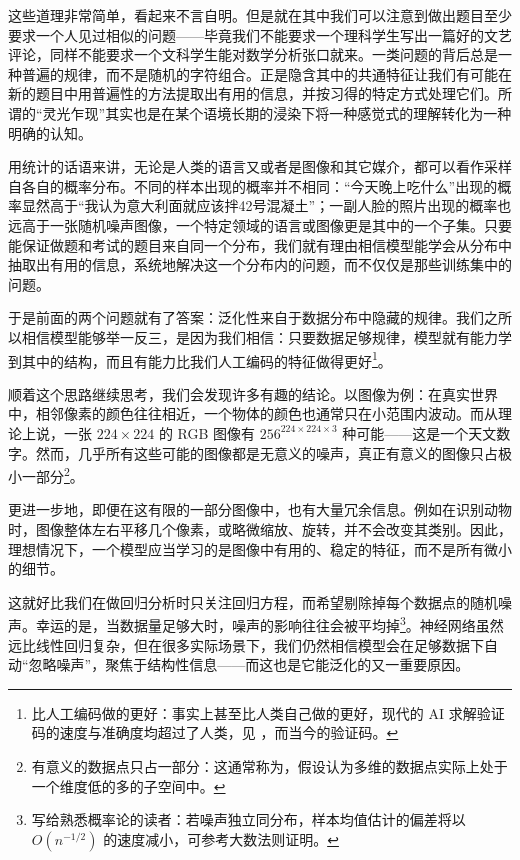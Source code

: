 这些道理非常简单，看起来不言自明。但是就在其中我们可以注意到做出题目至少要求一个人见过相似的问题——毕竟我们不能要求一个理科学生写出一篇好的文艺评论，同样不能要求一个文科学生能对数学分析张口就来。一类问题的背后总是一种普遍的规律，而不是随机的字符组合。正是隐含其中的共通特征让我们有可能在新的题目中用普遍性的方法提取出有用的信息，并按习得的特定方式处理它们。所谓的“灵光乍现”其实也是在某个语境长期的浸染下将一种感觉式的理解转化为一种明确的认知。

用统计的话语来讲，无论是人类的语言又或者是图像和其它媒介，都可以看作采样自各自的概率分布。不同的样本出现的概率并不相同：“今天晚上吃什么”出现的概率显然高于“我认为意大利面就应该拌42号混凝土”；一副人脸的照片出现的概率也远高于一张随机噪声图像，一个特定领域的语言或图像更是其中的一个子集。只要能保证做题和考试的题目来自同一个分布，我们就有理由相信模型能学会从分布中抽取出有用的信息，系统地解决这一个分布内的问题，而不仅仅是那些训练集中的问题。

于是前面的两个问题就有了答案：泛化性来自于数据分布中隐藏的规律。我们之所以相信模型能够举一反三，是因为我们相信：只要数据足够规律，模型就有能力学到其中的结构，而且有能力比我们人工编码的特征做得更好\footnote{比人工编码做的更好：事实上甚至比人类自己做的更好，现代的 AI 求解验证码的速度与准确度均超过了人类，见 ，而当今的验证码。}。

顺着这个思路继续思考，我们会发现许多有趣的结论。以图像为例：在真实世界中，相邻像素的颜色往往相近，一个物体的颜色也通常只在小范围内波动。而从理论上说，一张 $224 \times 224$ 的 RGB 图像有 $256^{224 \times 224 \times 3}$ 种可能——这是一个天文数字。然而，几乎所有这些可能的图像都是无意义的噪声，真正有意义的图像只占极小一部分\footnote{有意义的数据点只占一部分：这通常称为，假设认为多维的数据点实际上处于一个维度低的多的子空间中。}。

更进一步地，即便在这有限的一部分图像中，也有大量冗余信息。例如在识别动物时，图像整体左右平移几个像素，或略微缩放、旋转，并不会改变其类别。因此，理想情况下，一个模型应当学习的是图像中有用的、稳定的特征，而不是所有微小的细节。

这就好比我们在做回归分析时只关注回归方程，而希望剔除掉每个数据点的随机噪声。幸运的是，当数据量足够大时，噪声的影响往往会被平均掉\footnote{写给熟悉概率论的读者：若噪声独立同分布，样本均值估计的偏差将以 $O(n^{-1/2})$ 的速度减小，可参考大数法则证明。}。神经网络虽然远比线性回归复杂，但在很多实际场景下，我们仍然相信模型会在足够数据下自动“忽略噪声”，聚焦于结构性信息——而这也是它能泛化的又一重要原因。

